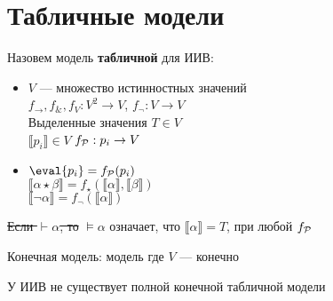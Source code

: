 \documentclass[english]{article}
\begin{document}
\section{Табличные модели}
\label{sec:org6895ad5}
\begin{definition}
	Назовем модель \textbf{табличной} для ИИВ:
	\begin{itemize}
		\item \(V\) --- множество истинностных значений \\
		      \(f_\to,f_\&, f_V: V^2 \to V\), \(f_\neg: V \to V\) \\
		      Выделенные значения \(T \in V\) \\
		      \(\llbracket p_i \rrbracket \in V\) \(f_\P : p_i \to V\)
		\item \(\eval{p_i} = f_\P(p_i)\) \\
		      \(\llbracket\alpha \star \beta\rrbracket = f_\star(\llbracket\alpha\rrbracket, \llbracket\beta\rrbracket)\) \\
		      \(\llbracket\neg \alpha\rrbracket = f_\neg(\llbracket\alpha\rrbracket)\)
	\end{itemize}
	\sout{Если \(\vdash \alpha\), то} \(\vDash \alpha\) означает, что \(\llbracket\alpha\rrbracket = T\), при любой \(f_\P\)
	\label{orgbefdb37}
\end{definition}
\begin{definition}
	Конечная модель: модель где \(V\) --- конечно
	\label{org9492f1f}
\end{definition}
\begin{theorem}
	У ИИВ не существует полной конечной табличной модели
	\label{org47ec0b1}
\end{theorem}
\end{document}

